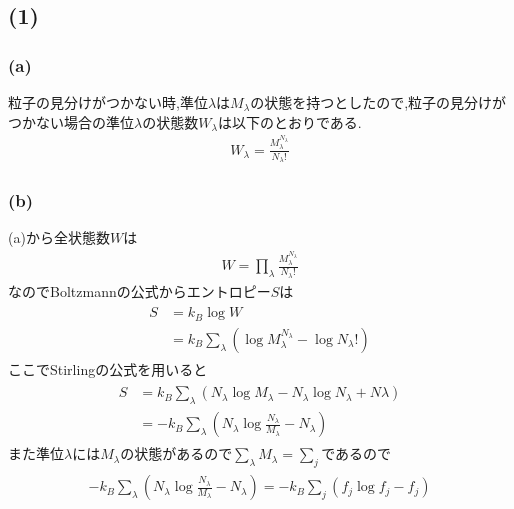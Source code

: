 \subsection*{(1)}
\subsubsection*{(a)}
粒子の見分けがつかない時,準位$\lambda$は$M_\lambda$の状態を持つとしたので,粒子の見分けがつかない場合の準位$\lambda$の状態数$W_\lambda$は以下のとおりである.
\begin{align}
  W_\lambda=\frac{M_\lambda^{N_\lambda}}{N_\lambda!}
\end{align}
\subsubsection*{(b)}
(a)から全状態数$W$は
\begin{align}
  W=\prod_\lambda\frac{M_\lambda^{N_\lambda}}{N_\lambda!}
\end{align}
なのでBoltzmannの公式からエントロピー$S$は
\begin{align}
  \begin{split}
    S&=k_B\log W\\
    &=k_B\sum_\lambda(\log M_\lambda^{N_\lambda}-\log N_\lambda!)
  \end{split}
\end{align}
ここでStirlingの公式を用いると
\begin{align}
  \begin{split}
    S&=k_B\sum_\lambda(N_\lambda\log M_\lambda-N_\lambda\log N_\lambda+N\lambda)\\
    &=-k_B\sum_\lambda\left(N_\lambda\log\frac{N_\lambda}{M_\lambda}-N_\lambda\right)
  \end{split}
\end{align}
また準位$\lambda$には$M_\lambda$の状態があるので$\sum_\lambda M_\lambda=\sum_j$であるので
\begin{align}
  \begin{split}
    -k_B\sum_\lambda\left(N_\lambda\log\frac{N_\lambda}{M_\lambda}-N_\lambda\right)=-k_B\sum_j(f_j\log f_j-f_j)
  \end{split}
\end{align}
